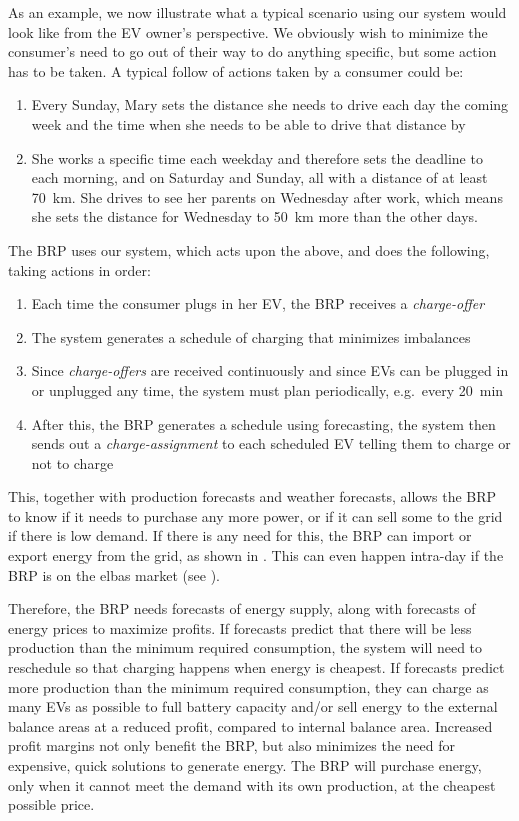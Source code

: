 As an example, we now illustrate what a typical scenario using our system would look like from the EV owner's perspective. We obviously wish to minimize the consumer's need to go out of their way to do anything specific, but some action has to be taken. A typical follow of actions taken by a consumer could be:

\begin{enumerate}
  \item Every Sunday, Mary sets the distance she needs to drive each day the coming week and the time when she needs to be able to drive that distance by
  \item She works a specific time each weekday and therefore sets the deadline to  each morning, and  on Saturday and Sunday, all with a distance of at least \SI{70}{\km}. She drives to see her parents on Wednesday after work, which means she sets the distance for Wednesday to \SI{50}{\km} more than the other days.
\end{enumerate}

The BRP uses our system, which acts upon the above, and does the following, taking actions in order:

\begin{enumerate}
  \item Each time the consumer plugs in her EV, the BRP receives a \emph{charge-offer}
  \item The system generates a schedule of charging that minimizes imbalances
  \item Since \emph{charge-offers} are received continuously and since EVs can be plugged in or unplugged any time, the system must plan periodically, e.g.\ every \SI{20}{\minute}
  \item After this, the BRP generates a schedule using forecasting, the system then sends out a \emph{charge-assignment} to each scheduled EV telling them to charge or not to charge
\end{enumerate}

This, together with production forecasts and weather forecasts, allows the BRP to know if it needs to purchase any more power, or if it can sell some to the grid if there is low demand. If there is any need for this, the BRP can import or export energy from the grid, as shown in . This can even happen intra-day if the BRP is on the elbas market (see ).

Therefore, the BRP needs forecasts of energy supply, along with forecasts of energy prices to maximize profits. If forecasts predict that there will be less production than the minimum required consumption, the system will need to reschedule so that charging happens when energy is cheapest. If forecasts predict more production than the minimum required consumption, they can charge as many EVs as possible to full battery capacity and\slash or sell energy to the external balance areas at a reduced profit, compared to internal balance area. Increased profit margins not only benefit the BRP, but also minimizes the need for expensive, quick solutions to generate energy. The BRP will purchase energy, only when it cannot meet the demand with its own production, at the cheapest possible price.

